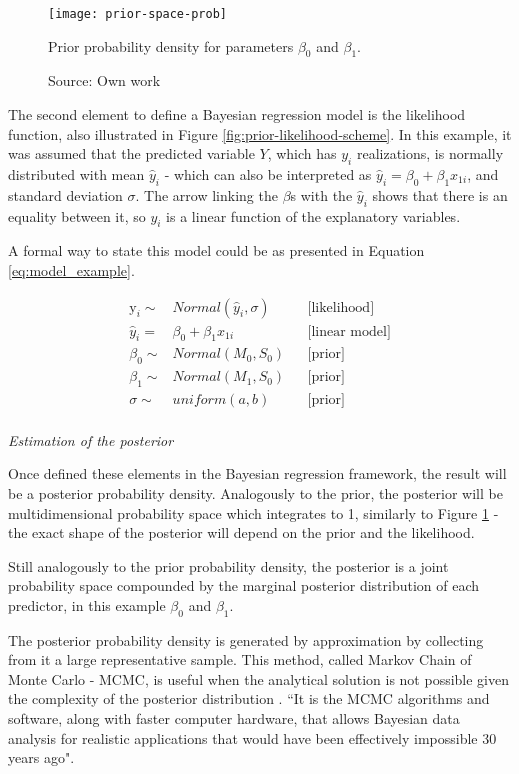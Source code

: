 \begin{figure}[H]
\centering
\texttt{[image: prior-space-prob]}
\caption{Prior probability density for parameters $\beta_0$ and $\beta_1$.}
\label{fig:prior-space-prob}
\caption*{Source: Own work}
\end{figure}

The second element to define a Bayesian regression model is the likelihood function, also illustrated in Figure \ref{fig:prior-likelihood-scheme}. In this example, it was assumed that the predicted variable $Y$, which has $y_i$ realizations, is normally distributed with mean $\hat{y}_i$ - which can also be interpreted as $\hat{y}_i = \beta_{0} + \beta_{1}x_{1i}$, and standard deviation $\sigma$. The arrow linking the $\beta$s with the $\hat{y}_i$ shows that there is an equality between it, so $y_i$ is a linear function of the explanatory variables.

A formal way to state this model could be as presented in Equation \ref{eq:model_example}.

\begin{align}
\label{eq:model_example}
\text{y}_i \sim& Normal(\hat{y}_i, \sigma) && \text{[likelihood]} \\
\hat{y}_i =& \beta_{0} + \beta_{1}x_{1i}     && \text{[linear model]}\nonumber\\
\beta_0 \sim& Normal (M_0, S_0) && \text{[prior]}\nonumber\\
\beta_1 \sim& Normal (M_1, S_0) && \text{[prior]}\nonumber\\
\sigma \sim& uniform(a,b) \nonumber          && \text{[prior]}
\end{align}
\\[3pt]

\textit{Estimation of the posterior}

Once defined these elements in the Bayesian regression framework, the result will be a posterior probability density. Analogously to the prior, the posterior will be multidimensional probability space which integrates to 1, similarly to Figure \ref{fig:prior-space-prob} - the exact shape of the posterior will depend on the prior and the likelihood. 

Still analogously to the prior probability density, the posterior is a joint probability space compounded by the marginal posterior distribution of each predictor, in this example $\beta_0$ and $\beta_1$.

The posterior probability density is generated by approximation by collecting from it a large representative sample. This method, called Markov Chain of Monte Carlo - MCMC, is useful when the analytical solution is not possible given the complexity of the posterior distribution \citep{kruschke2014}. ``It is the MCMC algorithms and software, along with faster computer hardware, that allows Bayesian data analysis for realistic applications that would have been effectively impossible 30 years ago"\citep[p.~144]{kruschke2014}.

